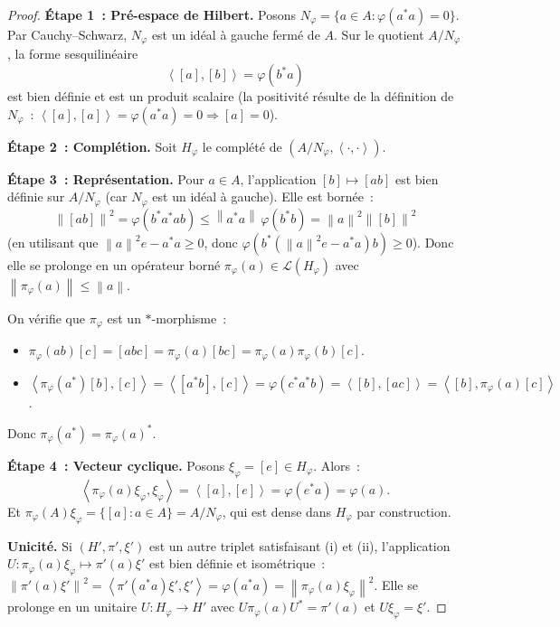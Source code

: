 \documentclass[a4paper,12pt]{book}
\newcommand{\norm}[1]{\left\| #1 \right\|}
\newcommand{\inner}[2]{\left\langle #1, #2 \right\rangle}
\theoremstyle{definition}
\theoremstyle{plain}
\theoremstyle{remark}
\begin{document}
\begin{proof}
\textbf{Étape 1~: Pré-espace de Hilbert.}
Posons $N_\varphi = \{a \in A : \varphi(a^*a) = 0\}$. Par Cauchy--Schwarz,
$N_\varphi$ est un idéal à gauche fermé de $A$. Sur le quotient $A / N_\varphi$,
la forme sesquilinéaire
\[
  \inner{[a]}{[b]} = \varphi(b^*a)
\]
est bien définie et est un produit scalaire (la positivité résulte de la définition de
$N_\varphi$~: $\inner{[a]}{[a]} = \varphi(a^*a) = 0 \Rightarrow [a] = 0$).

\textbf{Étape 2~: Complétion.}
Soit $H_\varphi$ le complété de $(A/N_\varphi, \inner{\cdot}{\cdot})$.

\textbf{Étape 3~: Représentation.}
Pour $a \in A$, l'application $[b] \mapsto [ab]$ est bien définie sur $A/N_\varphi$
(car $N_\varphi$ est un idéal à gauche). Elle est bornée~:
\[
  \norm{[ab]}^2 = \varphi(b^*a^*ab) \le \norm{a^*a}\,\varphi(b^*b) = \norm{a}^2\norm{[b]}^2
\]
(en utilisant que $\norm{a}^2 e - a^*a \ge 0$, donc
$\varphi(b^*(\norm{a}^2 e - a^*a)b) \ge 0$). Donc elle se prolonge en un opérateur borné
$\pi_\varphi(a) \in \mathcal{L}(H_\varphi)$ avec $\norm{\pi_\varphi(a)} \le \norm{a}$.

On vérifie que $\pi_\varphi$ est un $*$-morphisme~:
\begin{itemize}
  \item $\pi_\varphi(ab)[c] = [abc] = \pi_\varphi(a)[bc] = \pi_\varphi(a)\pi_\varphi(b)[c]$.
  \item $\inner{\pi_\varphi(a^*)[b]}{[c]} = \inner{[a^*b]}{[c]} = \varphi(c^*a^*b) = \inner{[b]}{[ac]} = \inner{[b]}{\pi_\varphi(a)[c]}$.
\end{itemize}
Donc $\pi_\varphi(a^*) = \pi_\varphi(a)^*$.

\textbf{Étape 4~: Vecteur cyclique.}
Posons $\xi_\varphi = [e] \in H_\varphi$. Alors~:
\[
  \inner{\pi_\varphi(a)\xi_\varphi}{\xi_\varphi}
    = \inner{[a]}{[e]} = \varphi(e^*a) = \varphi(a).
\]
Et $\pi_\varphi(A)\xi_\varphi = \{[a] : a \in A\} = A/N_\varphi$, qui est dense dans
$H_\varphi$ par construction.

\textbf{Unicité.} Si $(H', \pi', \xi')$ est un autre triplet satisfaisant (i) et (ii),
l'application $U : \pi_\varphi(a)\xi_\varphi \mapsto \pi'(a)\xi'$ est bien définie et
isométrique~:
$\norm{\pi'(a)\xi'}^2 = \inner{\pi'(a^*a)\xi'}{\xi'} = \varphi(a^*a) = \norm{\pi_\varphi(a)\xi_\varphi}^2$.
Elle se prolonge en un unitaire $U : H_\varphi \to H'$ avec $U\pi_\varphi(a)U^* = \pi'(a)$
et $U\xi_\varphi = \xi'$.
\end{proof}
\end{document}
